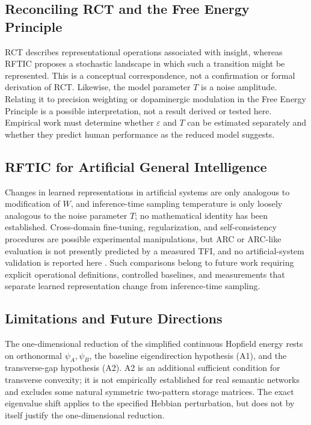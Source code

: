 \documentclass[a4paper,twocolumn,10pt]{article}
\newcommand{\eps}{\varepsilon}
\newcommand{\psiA}{\psi_A}
\newcommand{\psiB}{\psi_B}
\begin{document}
\subsection{Reconciling RCT and the Free Energy Principle}

RCT \citep{ohlsson1992insight, ohlsson2011deep} describes representational operations associated with insight,
whereas RFTIC proposes a stochastic landscape in which such a transition might be represented. This
is a conceptual correspondence, not a confirmation or formal derivation of RCT. Likewise, the model
parameter $T$ is a noise amplitude. Relating it to precision weighting or dopaminergic modulation in
the Free Energy Principle \citep{friston2010freeenergy,friston2017activeinference} is a possible interpretation, not a result derived or
tested here. Empirical work must determine whether $\eps$ and $T$ can be estimated separately and
whether they predict human performance as the reduced model suggests.

\subsection{RFTIC for Artificial General Intelligence}

Changes in learned representations in artificial systems are only analogous to modification of $W$,
and inference-time sampling temperature is only loosely analogous to the noise parameter $T$; no
mathematical identity has been established. Cross-domain fine-tuning, regularization, and
self-consistency procedures are possible experimental manipulations, but ARC or ARC-like evaluation
is not presently predicted by a measured TFI, and no artificial-system validation is reported here
\citep{chollet2019measure}. Such comparisons belong to future work requiring explicit operational
definitions, controlled baselines, and measurements that separate learned representation change from
inference-time sampling.

\subsection{Limitations and Future Directions}

The one-dimensional reduction of the simplified continuous Hopfield energy rests on orthonormal
$\psiA,\psiB$, the baseline eigendirection hypothesis (A1), and the transverse-gap hypothesis (A2).
A2 is an additional sufficient condition for transverse convexity; it is not empirically established
for real semantic networks and excludes some natural symmetric two-pattern storage matrices. The
exact eigenvalue shift applies to the specified Hebbian perturbation, but does not by itself justify
the one-dimensional reduction.
\end{document}
